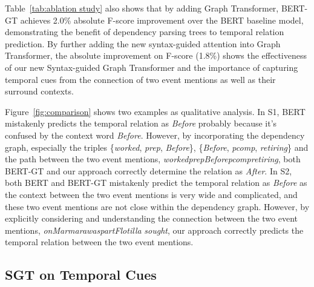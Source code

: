 Table~\ref{tab:ablation study} also shows that by adding Graph Transformer, BERT-GT achieves 2.0\% absolute F-score improvement over the BERT baseline model, demonstrating the benefit of dependency parsing trees to temporal relation prediction. By further adding the new syntax-guided attention into Graph Transformer, the absolute improvement on F-score (1.8\%) shows the effectiveness of our new Syntax-guided Graph Transformer and the importance of capturing temporal cues from the connection of two event mentions as well as their surround contexts.












Figure~\ref{fig:comparison} shows two examples as qualitative analysis. In S1, BERT mistakenly predicts the temporal relation as \textit{Before} probably because it's confused by the context word \textit{Before}. However, by incorporating the dependency graph, especially the triples \{\textit{worked}, \textit{prep}, \textit{Before}\}, \{\textit{Before}, \textit{pcomp}, \textit{retiring}\} and the path between the two event mentions, \textit{worked}\textit{prep}\textit{Before}\textit{pcomp}\textit{retiring}, both BERT-GT and our approach correctly determine the relation as \textit{After}. In S2, both BERT and BERT-GT mistakenly predict the temporal relation as \textit{Before} as the context between the two event mentions is very wide and complicated, and these two event mentions are not close within the dependency graph. However, by explicitly considering and understanding the connection between the two event mentions, \textit{on}\textit{Marmara}\textit{was}\textit{part}\textit{Flotilla}
\textit{sought}, our approach correctly predicts the temporal relation between the two event mentions.







\subsection{SGT on Temporal Cues}


